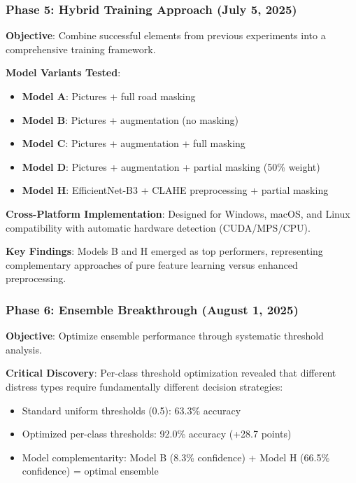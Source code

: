 \documentclass[12pt]{article}
\begin{document}
\subsubsection{Phase 5: Hybrid Training Approach (July 5, 2025)}

\textbf{Objective}: Combine successful elements from previous experiments into a comprehensive training framework.

\textbf{Model Variants Tested}:
\begin{itemize}[itemsep=1pt,parsep=0pt,topsep=2pt]
\item \textbf{Model A}: Pictures + full road masking
\item \textbf{Model B}: Pictures + augmentation (no masking)
\item \textbf{Model C}: Pictures + augmentation + full masking
\item \textbf{Model D}: Pictures + augmentation + partial masking (50\% weight)
\item \textbf{Model H}: EfficientNet-B3 + CLAHE preprocessing + partial masking
\end{itemize}

\textbf{Cross-Platform Implementation}: Designed for Windows, macOS, and Linux compatibility with automatic hardware detection (CUDA/MPS/CPU).

\textbf{Key Findings}: Models B and H emerged as top performers, representing complementary approaches of pure feature learning versus enhanced preprocessing.

\subsubsection{Phase 6: Ensemble Breakthrough (August 1, 2025)}

\textbf{Objective}: Optimize ensemble performance through systematic threshold analysis.

\textbf{Critical Discovery}: Per-class threshold optimization revealed that different distress types require fundamentally different decision strategies:

\begin{itemize}[itemsep=1pt,parsep=0pt,topsep=2pt]
\item Standard uniform thresholds (0.5): 63.3\% accuracy
\item Optimized per-class thresholds: 92.0\% accuracy (+28.7 points)
\item Model complementarity: Model B (8.3\% confidence) + Model H (66.5\% confidence) = optimal ensemble
\end{itemize}
\end{document}
